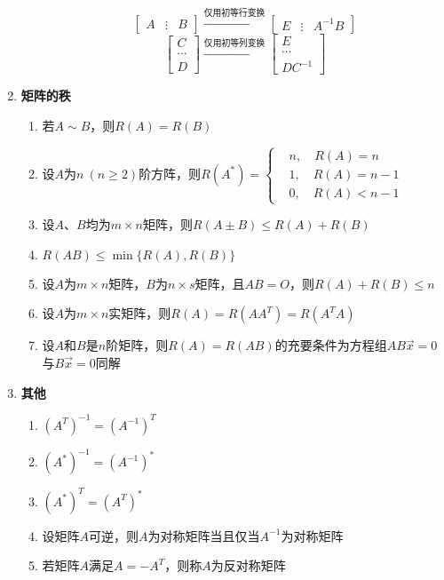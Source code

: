\documentclass[12pt,a4paper,UTF8]{book}
\begin{document}
\begin{enumerate}
\begin{enumerate}
\[\begin{bmatrix}A&\vdots&B\end{bmatrix}\xrightarrow{\text{仅用初等行变换}}\begin{bmatrix}E&\vdots&A^{-1}B\end{bmatrix}\]
\[\begin{bmatrix}C\\\cdots\\D\end{bmatrix}\xrightarrow{\text{仅用初等列变换}}\begin{bmatrix}E\\\cdots\\DC^{-1}\end{bmatrix}\]
\end{enumerate}
\item \textbf{矩阵的秩}
\begin{enumerate}
\item 若$A\sim B$，则$R\left(A\right)=R\left(B\right)$
\item 设$A$为$n\ \left(n\geq2\right)$阶方阵，则$R\left(A^*\right)=\left\{\begin{aligned}
&n,\quad R\left(A\right)=n\\
&1,\quad R\left(A\right)=n-1\\
&0,\quad R\left(A\right)<n-1
\end{aligned}\right.$
\item 设$A$、$B$均为$m\times n$矩阵，则$R\left(A\pm B\right)\leq R\left(A\right)+R\left(B\right)$
\item $R\left(AB\right)\leq\min\{R\left(A\right),R\left(B\right)\}$
\item 设$A$为$m\times n$矩阵，$B$为$n\times s$矩阵，且$AB=O$，则$R\left(A\right)+R\left(B\right)\leq n$
\item 设$A$为$m\times n$实矩阵，则$R\left(A\right)=R\left(AA^T\right)=R\left(A^TA\right)$
\item 设$A$和$B$是$n$阶矩阵，则$R\left(A\right)=R\left(AB\right)$的充要条件为方程组$AB\vec{x}=0$与$B\vec{x}=0$同解
\end{enumerate}
\item \textbf{其他}
\begin{enumerate}
\item $\left(A^T\right)^{-1}=\left(A^{-1}\right)^T$
\item $\left(A^*\right)^{-1}=\left(A^{-1}\right)^*$
\item $\left(A^*\right)^T=\left(A^T\right)^*$
\item 设矩阵$A$可逆，则$A$为对称矩阵当且仅当$A^{-1}$为对称矩阵
\item 若矩阵$A$满足$A=-A^T$，则称$A$为反对称矩阵
\end{enumerate}
\end{enumerate}
\end{document}
